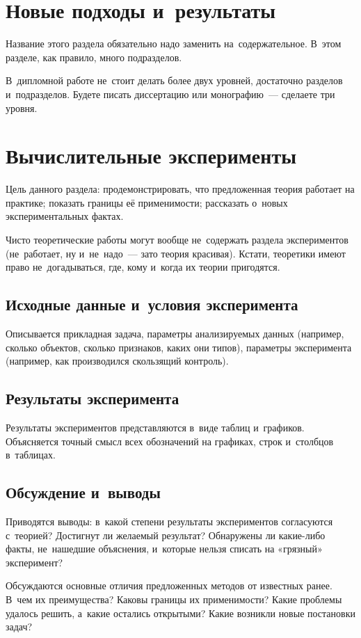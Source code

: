 \documentclass[12pt]{article}
\begin{document}
\section{Новые подходы и~результаты}

Название этого раздела обязательно надо заменить на~содержательное.
В~этом разделе, как правило, много подразделов.

В~дипломной работе не~стоит делать более двух уровней, достаточно
разделов и~подразделов.  Будете писать диссертацию или монографию~---
сделаете три уровня.

\section{Вычислительные эксперименты}

Цель данного раздела: продемонстрировать, что предложенная теория
работает на практике; показать границы её применимости; рассказать
о~новых экспериментальных фактах.

Чисто теоретические работы могут вообще не~содержать раздела
экспериментов (не~работает, ну и~не~надо~--- зато теория красивая).
Кстати, теоретики имеют право не~догадываться, где, кому и~когда их
теории пригодятся.

\subsection{Исходные данные и~условия эксперимента}
Описывается прикладная задача, параметры анализируемых данных
(например, сколько объектов, сколько признаков, каких они типов),
параметры эксперимента (например, как производился скользящий
контроль).

\subsection{Результаты эксперимента}
Результаты экспериментов представляются в~виде таблиц и~графиков.
Объясняется точный смысл всех обозначений на графиках, строк
и~столбцов в~таблицах.

\subsection{Обсуждение и~выводы}
Приводятся выводы: в~какой степени результаты экспериментов
согласуются с~теорией?  Достигнут ли желаемый результат?  Обнаружены
ли какие-либо факты, не~нашедшие объяснения, и~которые нельзя списать
на «грязный» эксперимент?

Обсуждаются основные отличия предложенных методов от известных ранее.
В~чем их преимущества?  Каковы границы их применимости?  Какие
проблемы удалось решить, а~какие остались открытыми?  Какие возникли
новые постановки задач?
\end{document}
